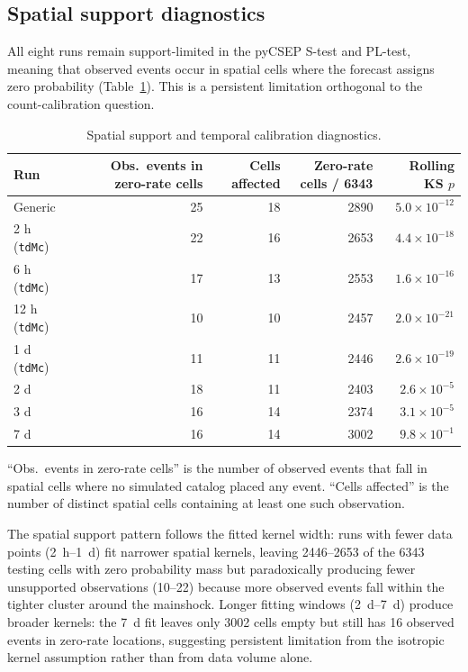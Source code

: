 \documentclass[12pt,letterpaper]{article}
\begin{document}
\subsection{Spatial support diagnostics}
\label{sec:spatial}

All eight runs remain support-limited in the pyCSEP S-test and PL-test, meaning
that observed events occur in spatial cells where the forecast assigns zero
probability (Table~\ref{tab:support}). This is a persistent limitation
orthogonal to the count-calibration question.

\begin{table}[ht]
\centering
\small
\caption{Spatial support and temporal calibration diagnostics.}
\label{tab:support}
\begin{tabular}{lrrrr}
\toprule
Run & Obs.\ events in zero-rate cells & Cells affected & Zero-rate cells / 6343 & Rolling KS $p$ \\
\midrule
Generic & 25 & 18 & 2890 & $5.0\times10^{-12}$ \\
2 h (\texttt{tdMc}) & 22 & 16 & 2653 & $4.4\times10^{-18}$ \\
6 h (\texttt{tdMc}) & 17 & 13 & 2553 & $1.6\times10^{-16}$ \\
12 h (\texttt{tdMc}) & 10 & 10 & 2457 & $2.0\times10^{-21}$ \\
1 d (\texttt{tdMc}) & 11 & 11 & 2446 & $2.6\times10^{-19}$ \\
2 d & 18 & 11 & 2403 & $2.6\times10^{-5}$ \\
3 d & 16 & 14 & 2374 & $3.1\times10^{-5}$ \\
7 d & 16 & 14 & 3002 & $9.8\times10^{-1}$ \\
\bottomrule
\end{tabular}
\vspace{4pt}
\raggedright
\footnotesize
``Obs.\ events in zero-rate cells'' is the number of observed events that fall
in spatial cells where no simulated catalog placed any event. ``Cells affected''
is the number of distinct spatial cells containing at least one such observation.
\end{table}

The spatial support pattern follows the fitted kernel width: runs with fewer
data points (2~h--1~d) fit narrower spatial kernels, leaving 2446--2653 of the
6343 testing cells with zero probability mass but paradoxically producing fewer
unsupported observations (10--22) because more observed events fall within the
tighter cluster around the mainshock. Longer fitting windows (2~d--7~d) produce
broader kernels: the 7~d fit leaves only 3002 cells empty but still has 16
observed events in zero-rate locations, suggesting persistent limitation from
the isotropic kernel assumption rather than from data volume alone.
\end{document}
